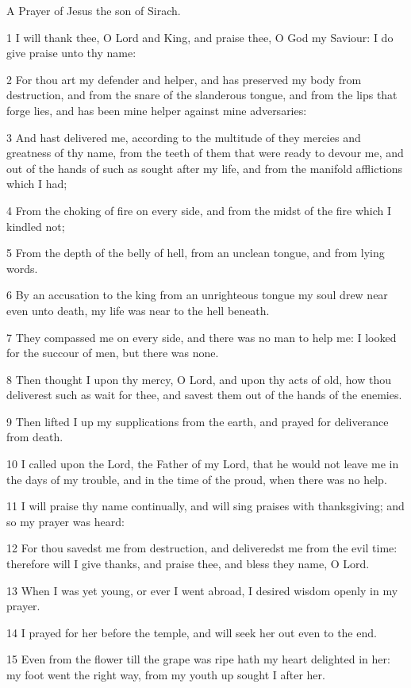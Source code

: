 \par A Prayer of Jesus the son of Sirach.

\par 1 I will thank thee, O Lord and King, and praise thee, O God my Saviour: I do give praise unto thy name:
\par 2 For thou art my defender and helper, and has preserved my body from destruction, and from the snare of the slanderous tongue, and from the lips that forge lies, and has been mine helper against mine adversaries:
\par 3 And hast delivered me, according to the multitude of they mercies and greatness of thy name, from the teeth of them that were ready to devour me, and out of the hands of such as sought after my life, and from the manifold afflictions which I had;
\par 4 From the choking of fire on every side, and from the midst of the fire which I kindled not;
\par 5 From the depth of the belly of hell, from an unclean tongue, and from lying words.
\par 6 By an accusation to the king from an unrighteous tongue my soul drew near even unto death, my life was near to the hell beneath.
\par 7 They compassed me on every side, and there was no man to help me: I looked for the succour of men, but there was none.
\par 8 Then thought I upon thy mercy, O Lord, and upon thy acts of old, how thou deliverest such as wait for thee, and savest them out of the hands of the enemies.
\par 9 Then lifted I up my supplications from the earth, and prayed for deliverance from death.
\par 10 I called upon the Lord, the Father of my Lord, that he would not leave me in the days of my trouble, and in the time of the proud, when there was no help.
\par 11 I will praise thy name continually, and will sing praises with thanksgiving; and so my prayer was heard:
\par 12 For thou savedst me from destruction, and deliveredst me from the evil time: therefore will I give thanks, and praise thee, and bless they name, O Lord.
\par 13 When I was yet young, or ever I went abroad, I desired wisdom openly in my prayer.
\par 14 I prayed for her before the temple, and will seek her out even to the end.
\par 15 Even from the flower till the grape was ripe hath my heart delighted in her: my foot went the right way, from my youth up sought I after her.
